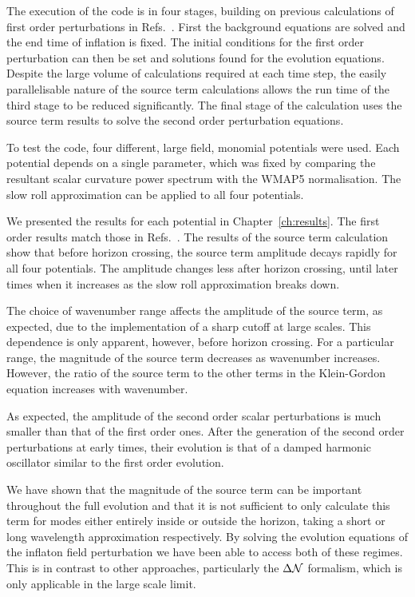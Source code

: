 The execution of the code is in four stages, building on previous calculations of
first order perturbations in Refs.~\cite{Martin:2006rs, Ringeval:2007am,
Salopek:1988qh}. First the background equations are solved and the end time of
inflation is fixed. The initial conditions for the first order perturbation can then
be set and solutions found for the evolution equations.
Despite the large volume of calculations required at each
time step, the easily parallelisable nature of the source term calculations allows
the run time of the third stage to be reduced significantly. 
The final stage of the calculation uses the source term results to solve the second
order perturbation equations.


To test the code, four different, large field, monomial potentials were used. Each
potential depends on a single parameter, which was fixed by comparing the resultant scalar
curvature power spectrum with the WMAP5 normalisation. The slow roll
approximation can be applied to all four potentials.

We presented the results for each potential in Chapter~\ref{ch:results}. The first
order results match those in Refs.~\cite{Martin:2006rs, Ringeval:2007am, Salopek:1988qh}. The
results of the source term calculation show that before
horizon crossing, the source term amplitude decays rapidly for all four potentials.
The amplitude changes less after horizon crossing, until later times when it increases
as the slow roll approximation breaks down.

The choice of wavenumber range affects the amplitude of the source term, as
expected, due to the implementation of a sharp cutoff at large scales. This
dependence is only apparent, however, before horizon crossing. For a particular
range,  the magnitude of the source term decreases as wavenumber increases. However,
the ratio of the source term to the other terms in the Klein-Gordon equation increases with
wavenumber. 

As expected, the amplitude of the second order scalar perturbations is much smaller
than that of the first order ones. After the generation of the second order
perturbations at early times, their evolution is that of a damped harmonic
oscillator similar to the first order evolution.

We have shown that the magnitude of the source term can be important throughout the
full evolution and that it is not sufficient to only calculate this term for
modes either entirely inside or outside the horizon, \iec taking a short or long
wavelength approximation respectively. By solving the evolution equations of the
inflaton field perturbation we have been able to access both of these
regimes. This is in contrast to other approaches, particularly the $\Delta\mathcal{N}$
formalism, which is only applicable in the large scale limit.


